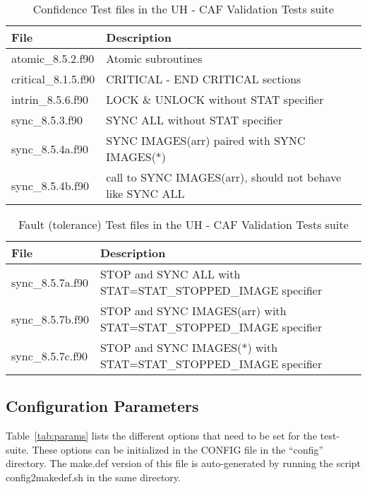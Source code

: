 \begin{table}[h]
\small
\caption{Confidence Test files in the UH - CAF Validation Tests suite}
\label{tab:confidence_files}
\begin{tabular}{|l|p{8cm}|}
\hline
File & Description \\ \hline
atomic\_8.5.2.f90 & Atomic subroutines\\ \hline
critical\_8.1.5.f90 & CRITICAL - END CRITICAL sections\\ \hline
intrin\_8.5.6.f90  & LOCK \& UNLOCK without STAT specifier\\ \hline
sync\_8.5.3.f90  & SYNC ALL without STAT specifier\\ \hline
sync\_8.5.4a.f90 & SYNC IMAGES(arr) paired with SYNC IMAGES(*)\\ \hline
sync\_8.5.4b.f90 & call to SYNC IMAGES(arr), should not behave like SYNC ALL\\ \hline
\hline
\end{tabular}
\end{table}

\begin{table}[h]
\small
\caption{Fault (tolerance) Test files in the UH - CAF Validation Tests suite}
\label{tab:fault_files}
\begin{tabular}{|l|p{8cm}|}
\hline
File & Description \\ \hline
sync\_8.5.7a.f90 & STOP and SYNC ALL with STAT=STAT\_STOPPED\_IMAGE specifier\\ \hline
sync\_8.5.7b.f90 & STOP and SYNC IMAGES(arr) with STAT=STAT\_STOPPED\_IMAGE specifier\\ \hline
sync\_8.5.7c.f90 &  STOP and SYNC IMAGES(*) with STAT=STAT\_STOPPED\_IMAGE specifier\\ \hline
\end{tabular}
\end{table}

\subsection{Configuration Parameters}
Table~\ref{tab:params} lists the different options that need to be
set for the test-suite. These options can be initialized in the
CONFIG file in the ``config'' directory. The make.def version of
this file is auto-generated by running the script
config2makedef.sh in the same directory.

